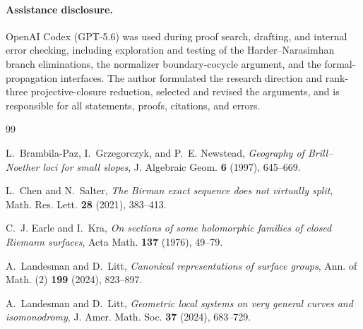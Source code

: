 \documentclass[11pt]{article}
\theoremstyle{definition}
\begin{document}
\paragraph{Assistance disclosure.}
OpenAI Codex (GPT-5.6) was used during proof search, drafting, and internal
error checking, including exploration and testing of the
Harder--Narasimhan branch eliminations, the normalizer boundary-cocycle
argument, and the formal-propagation interfaces.  The author formulated the
research direction and rank-three projective-closure reduction, selected and
revised the arguments, and is responsible for all statements, proofs,
citations, and errors.

\begin{thebibliography}{99}

L.~Brambila-Paz, I.~Grzegorczyk, and P.~E. Newstead,
\emph{Geography of Brill--Noether loci for small slopes},
J. Algebraic Geom. \textbf{6} (1997), 645--669.

L.~Chen and N.~Salter,
\emph{The Birman exact sequence does not virtually split},
Math. Res. Lett. \textbf{28} (2021), 383--413.

C.~J. Earle and I.~Kra,
\emph{On sections of some holomorphic families of closed Riemann surfaces},
Acta Math. \textbf{137} (1976), 49--79.

A.~Landesman and D.~Litt,
\emph{Canonical representations of surface groups},
Ann. of Math. (2) \textbf{199} (2024), 823--897.

A.~Landesman and D.~Litt,
\emph{Geometric local systems on very general curves and isomonodromy},
J. Amer. Math. Soc. \textbf{37} (2024), 683--729.

\end{thebibliography}
\end{document}
